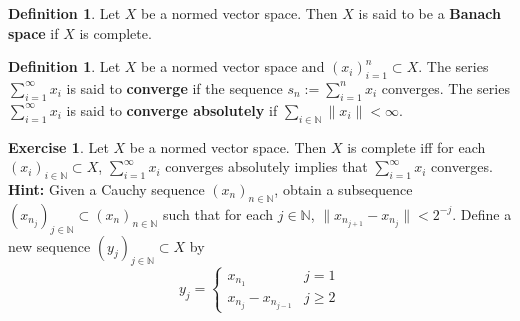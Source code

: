 \documentclass[12pt]{amsart}
\theoremstyle{definition}
\newtheorem{defn}[definition]{Definition}
\newtheorem{ex}[definition]{Exercise}
\newcommand{\N}{\mathbb{N}}
\newcommand{\seq}[2]{(#1_{#2})_{#2 \in \N}}
\begin{document}
	\begin{defn}
		Let $X$ be a normed vector space. Then $X$ is said to be a \textbf{Banach space} if $X$ is complete.  
	\end{defn}
	
	\begin{defn}
		Let $X$ be a normed vector space and $(x_i)_{i=1}^n \subset X$. The series $\sum_{i =1}^{\infty}x_i$ is said to \textbf{converge} if the sequence $s_n := \sum_{i=1}^n x_i$ converges. The series $\sum_{i =1}^{\infty}x_i$ is said to \textbf{converge absolutely} if $\sum_{i\in \N}\|x_i \|< \infty$.
	\end{defn}
	
	\begin{ex}
		Let $X$ be a normed vector space. Then $X$ is complete iff for each $\seq{x}{i} \subset X$, $\sum_{i =1}^{\infty}x_i$ converges absolutely implies that $\sum_{i=1}^{\infty}x_i$ converges. \\
		\textbf{Hint:} Given a Cauchy sequence $(x_n)_{n \in \N}$, obtain a subsequence $(x_{n_j})_{j \in \N} \subset (x_n)_{n \in \N}$ such that for each $j \in \N$, $\|x_{n_{j+1}} - x_{n_{j}}\| < 2^{-j}$. Define a new sequence $(y_j)_{j \in \N} \subset X$ by 
		\[
		y_j = 
		\begin{cases}
		x_{n_1} & j =1 \\  
		x_{n_j} - x_{n_{j-1}} & j \geq 2	
		\end{cases}
		\] 
	\end{ex}
	
\end{document}
